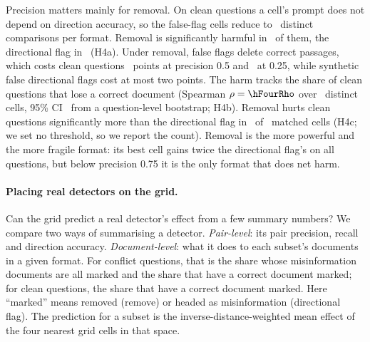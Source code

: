 Precision matters mainly for removal. On clean questions a cell's prompt does not depend
on direction accuracy, so the false-flag cells reduce to \hFourRemN\ distinct comparisons per format. Removal is
significantly harmful in \hFourRemHarm\ of them, the directional flag in \hFourDirHarm\ (H4a). Under removal, false flags
delete correct passages, which costs clean questions \agRemHalfDOneClean\ points at precision 0.5 and
\agRemQuDOneClean\ at 0.25, while synthetic false directional flags cost at most two points. The harm tracks the
share of clean questions that lose a correct document (Spearman $\rho=\hFourRho$ over \hFourRhoCells\ distinct
cells, 95\% CI \hFourRhoCI\ from a question-level bootstrap; H4b). Removal hurts clean questions significantly more
than the directional flag in \hFourRemWorse\ of \hFourMatched\ matched cells (H4c; we set no threshold, so we report
the count). Removal is the more powerful and the more fragile format: its best cell gains twice the directional
flag's on all questions, but below precision 0.75 it is the only format that does net harm.


\paragraph{Placing real detectors on the grid.}
\label{sec:placement}
Can the grid predict a real detector's effect from a few summary numbers? We compare two ways of summarising a
detector. \emph{Pair-level}: its pair precision, recall and direction accuracy. \emph{Document-level}: what it does
to each subset's documents in a given format. For conflict questions, that is the share whose misinformation documents
are all marked and the share that have a correct document marked; for clean questions, the share that have a correct
document marked. Here ``marked'' means removed (remove) or headed as misinformation (directional flag). The prediction
for a subset is the inverse-distance-weighted mean effect of the four nearest grid cells in that space.

